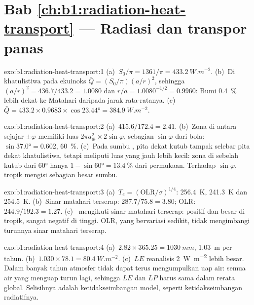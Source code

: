 \section*{Bab \ref{ch:b1:radiation-heat-transport} --- Radiasi dan transpor panas}

\begin{solution}{exo:b1:radiation-heat-transport:1}
(a)~$S_0/\pi = 1361/\pi = \qty{433.2}{W.m^{-2}}$. (b)~Di khatulistiwa pada ekuinoks
$\bar Q = (S_0/\pi)(a/r)^2$, sehingga $(a/r)^2 = 436.7/433.2 = 1.0080$ dan $r/a =
1.0080^{-1/2} = 0.9960$: Bumi \qty{0.4}{\percent} lebih dekat ke Matahari daripada
jarak rata-ratanya. (c)~$\bar Q = 433.2 \times 0.9683 \times \cos\ang{23.44} =
\qty{384.9}{W.m^{-2}}$.
\end{solution}

\begin{solution}{exo:b1:radiation-heat-transport:2}
(a)~$415.6/172.4 = 2.41$. (b)~Zona di antara sejajar $\pm\varphi$ memiliki luas
$2\pi a_\oplus^2 \times 2\sin\varphi$, sebagian $\sin\varphi$ dari bola:
$\sin\ang{37.0} = 0.602$, \qty{60}{\percent}. (c)~Pada sumbu , pita dekat kutub
tampak selebar pita dekat khatulistiwa, tetapi meliputi luas yang jauh lebih kecil: zona
di sebelah kutub dari \ang{60} hanya $1 - \sin\ang{60} =
\qty{13.4}{\percent}$ dari permukaan. Terhadap $\sin\varphi$, tropik mengisi sebagian besar
sumbu.
\end{solution}

\begin{solution}{exo:b1:radiation-heat-transport:3}
(a)~$T_e = (\text{OLR}/\sigma)^{1/4}$: \qty{256.4}{K}, \qty{241.3}{K} dan
\qty{254.5}{K}. (b)~Sinar matahari terserap: $287.7/75.8 = 3.80$; OLR: $244.9/192.3 =
1.27$. (c)~ mengikuti sinar matahari terserap: positif dan besar di tropik,
sangat negatif di  tinggi. OLR, yang bervariasi sedikit, tidak mengimbangi
turunnya sinar matahari terserap.
\end{solution}

\begin{solution}{exo:b1:radiation-heat-transport:4}
(a)~$2.82 \times 365.25 = \qty{1030}{mm}$, \qty{1.03}{m} per tahun. (b)~$1.030 \times
78.1 = \qty{80.4}{W.m^{-2}}$.
(c)~$LE$ reanalisis \qty{2}{W.m^{-2}} lebih besar. Dalam banyak tahun atmosfer tidak dapat
terus mengumpulkan uap air: semua air yang menguap turun lagi, sehingga $LE$ dan $LP$
harus sama dalam rerata global. Selisihnya adalah ketidakseimbangan model, seperti
ketidakseimbangan radiatifnya.
\end{solution}

